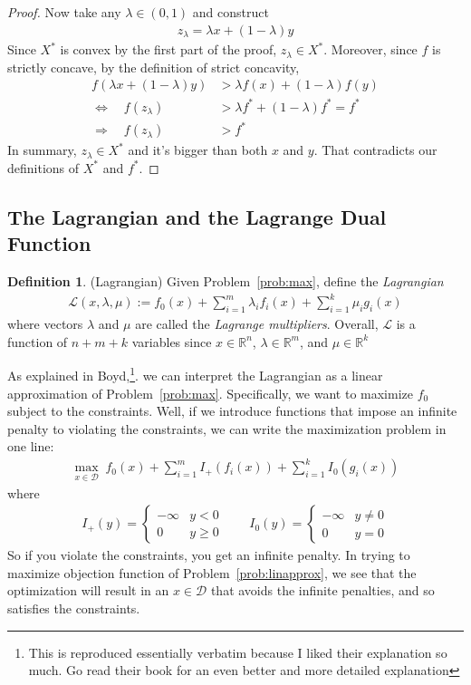 \documentclass[12pt]{book}
\numberwithin{equation}{section} %
\theoremstyle{plain}
\theoremstyle{definition}
\newtheorem{defn}[thm]{Definition}
\theoremstyle{remark}
\newcommand{\sL}{\mathscr{L}}
\newcommand{\Rn}{\mathbb{R}^n}
\begin{document}
\begin{proof}
Now take any $\lambda\in(0,1)$ and construct
\begin{align*}
  z_\lambda = \lambda x + (1-\lambda)y
\end{align*}
Since $X^*$ is convex by the first part of the proof, $z_\lambda\in
X^*$. Moreover, since $f$ is strictly concave, by the definition of
strict concavity,
\begin{align*}
  f(\lambda x + (1-\lambda) y)
  &>
  \lambda f(x) + (1-\lambda) f(y) \\
  \Leftrightarrow \quad
  f(z_\lambda) &> \lambda f^* + (1-\lambda) f^* = f^* \\
  \Rightarrow\quad
  f(z_\lambda) &> f^*
\end{align*}
In summary, $z_\lambda \in X^*$ and it's bigger than both $x$ and $y$.
That contradicts our definitions of $X^*$ and $f^*$.
\end{proof}

\subsection{The Lagrangian and the Lagrange Dual Function}

\begin{defn}{(Lagrangian)}
Given Problem~\ref{prob:max}, define the \emph{Lagrangian}
\begin{align*}
    \sL(x,\lambda,\mu)
    := f_0(x)
    + \sum^m_{i=1} \lambda_i f_i(x)
    + \sum^k_{i=1} \mu_i g_i(x)
\end{align*}
where vectors $\lambda$ and $\mu$ are called the \emph{Lagrange
multipliers}. Overall, $\sL$ is a function of $n+m+k$ variables since
$x\in\Rn$, $\lambda\in\mathbb{R}^m$, and $\mu\in\mathbb{R}^k$
\end{defn}

As explained in Boyd,\footnote{This is reproduced essentially verbatim
because I liked their explanation so much. Go read their book for an
even better and more detailed explanation}.  we can interpret the
Lagrangian as a linear approximation of Problem~\ref{prob:max}.
Specifically, we want to maximize $f_0$ subject to the constraints.
Well, if we introduce functions that impose an infinite penalty to
violating the constraints, we can write the maximization problem in one
line:
\begin{align}
  \label{prob:linapprox}
  \max_{x\in\mathcal{D}} \;
  f_0(x) + \sum^m_{i=1} I_+(f_i(x))
  + \sum^k_{i=1} I_0(g_i(x))
\end{align}
where
\begin{align*}
  I_+(y) =
  \begin{cases}
    -\infty & y < 0 \\
    0 & y \geq 0
  \end{cases}
  \qquad
  I_0(y) =
  \begin{cases}
    -\infty & y \neq 0 \\
    0 & y = 0
  \end{cases}
\end{align*}
So if you violate the constraints, you get an infinite penalty.  In
trying to maximize objection function of Problem~\ref{prob:linapprox},
we see that the optimization will result in an $x\in\mathcal{D}$ that
avoids the infinite penalties, and so satisfies the constraints.
\end{document}
